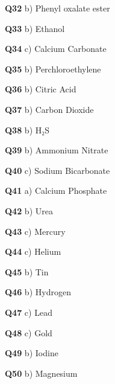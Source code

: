 \textbf{Q32} b) Phenyl oxalate ester\par
\textbf{Q33} b) Ethanol\par
\textbf{Q34} c) Calcium Carbonate\par
\textbf{Q35} b) Perchloroethylene\par
\textbf{Q36} b) Citric Acid\par
\textbf{Q37} b) Carbon Dioxide\par
\textbf{Q38} b) H₂S\par
\textbf{Q39} b) Ammonium Nitrate\par
\textbf{Q40} c) Sodium Bicarbonate\par
\textbf{Q41} a) Calcium Phosphate\par
\textbf{Q42} b) Urea\par
\textbf{Q43} c) Mercury\par
\textbf{Q44} c) Helium\par
\textbf{Q45} b) Tin\par
\textbf{Q46} b) Hydrogen\par
\textbf{Q47} c) Lead\par
\textbf{Q48} c) Gold\par
\textbf{Q49} b) Iodine\par
\textbf{Q50} b) Magnesium\par